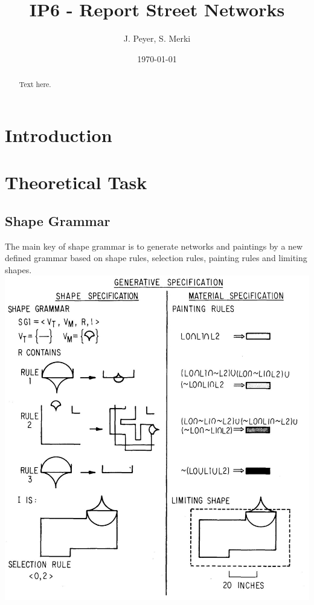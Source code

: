 \documentclass[11pt, a4paper]{report}
\begin{document}
\begin{titlepage}
	\title{IP6 - Report Street Networks} 
	\date{\today} 
	\author{J. Peyer, S. Merki} 
	\maketitle	
\end{titlepage}
\setcounter{page}{1}

\tableofcontents 



\begin{abstract}
	Text here.
\end{abstract}

\chapter{Introduction} 

\chapter{Theoretical Task} 
\section{Shape Grammar} 
The main key of shape grammar is to generate networks and paintings by a new defined grammar based on shape rules, selection rules, painting rules and limiting shapes. 
\newline
\includegraphics[scale=0.9]{generativ_specification}
\end{document}
